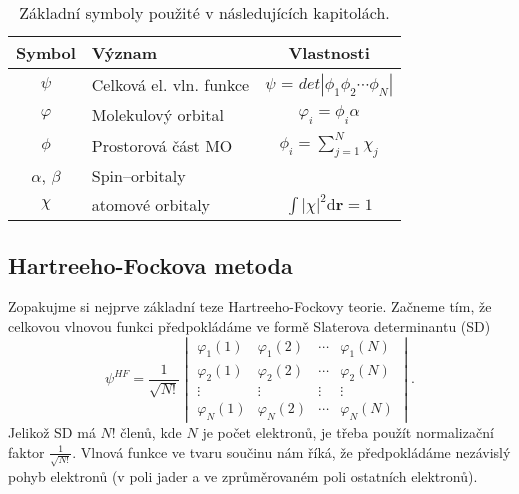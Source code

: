 \begin{table}[ht]
\centering
\caption{Základní symboly použité v následujících kapitolách.}
\begin{tabular}{|c|l|c|}
\hline 
\rule[-1ex]{0pt}{2.5ex} Symbol & 	Význam	& Vlastnosti \\ 
\hline 
\rule[-1ex]{0pt}{2.5ex} $\psi$ & Celková el. vln. funkce  & $\psi$ = $det|\phi_1 \phi_2 \cdots \phi_N |$ \\ 
\hline 
\rule[-1ex]{0pt}{2.5ex} $\varphi$ & Molekulový orbital & $\varphi_i=\phi_i \alpha $\\ 
\hline 
\rule[-1ex]{0pt}{2.5ex} $\phi$ & Prostorová část MO & $\phi_i=\sum_{j=1}^N \chi_j $ \\ 
\hline 
\rule[-1ex]{0pt}{2.5ex} $\alpha$, $\beta$  & Spin--orbitaly & \\ 
\hline 
\rule[-0ex]{0pt}{2.5ex} $\chi$ & atomové orbitaly & $\int |\chi|^2 \mathrm{d}\textbf{r} = 1 $ \\
\hline
\end{tabular} 
\label{tab:vlnfunkce}
\end{table}

\subsection{Hartreeho-Fockova metoda}

Zopakujme si nejprve základní teze Hartreeho-Fockovy teorie. Začneme tím, že celkovou vlnovou funkci předpokládáme ve formě Slaterova determinantu (SD)
\begin{equation}
\psi^{HF}=\frac{1}{\sqrt{N!}}\begin{vmatrix}
\varphi_1(1) & \varphi_1(2) & \cdots & \varphi_1(N) \\
\varphi_2(1) & \varphi_2(2) & \cdots & \varphi_2(N) \\
\vdots & \vdots & \vdots & \vdots \\
\varphi_N(1) & \varphi_N (2) & \cdots & \varphi_N(N)
\end{vmatrix}.
\end{equation}
Jelikož SD má $N!$ členů, kde $N$ je počet elektronů, je třeba použít normalizační faktor $\frac{1}{\sqrt{N!}}$. Vlnová funkce ve tvaru součinu nám říká, že předpokládáme nezávislý pohyb elektronů (v poli jader a ve zprůměrovaném poli ostatních elektronů).

